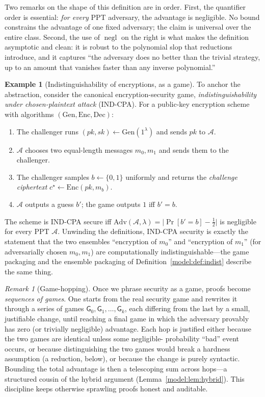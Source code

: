 \documentclass[11pt,a4paper]{article}
\theoremstyle{definition}
\newtheorem{example}[theorem]{Example}
\theoremstyle{remark}
\newtheorem{remark}[theorem]{Remark}
\DeclareMathOperator{\negl}{negl}
\begin{document}
Two remarks on the shape of this definition are in order. First, the quantifier
order is essential: \emph{for every} PPT adversary, the advantage is negligible.
No bound constrains the advantage of one fixed adversary; the claim is universal over
the entire class. Second, the use of \(\negl\) on the right is what makes the
definition asymptotic and clean: it is robust to the polynomial slop that
reductions introduce, and it captures ``the adversary does no better than the trivial
strategy, up to an amount that vanishes faster than any inverse polynomial.''

\begin{example}[Indistinguishability of encryptions, as a game]\label{model:exp:ind-cpa}
To anchor the abstraction, consider the canonical encryption-security game,
\emph{indistinguishability under chosen-plaintext attack} (IND-CPA). For a
public-key encryption scheme with algorithms
\((\mathrm{Gen},\mathrm{Enc},\mathrm{Dec})\):
\begin{enumerate}
\item The challenger runs \((pk,sk)\leftarrow \mathrm{Gen}(1^\lambda)\) and sends
  \(pk\) to \(\mathcal{A}\).
\item \(\mathcal{A}\) chooses two equal-length messages \(m_0, m_1\) and sends
  them to the challenger.
\item The challenger samples \(b \leftarrow \{0,1\}\) uniformly and returns the
  \emph{challenge ciphertext} \(c^\star \leftarrow \mathrm{Enc}(pk, m_b)\).
\item \(\mathcal{A}\) outputs a guess \(b'\); the game outputs \(1\) iff
  \(b'=b\).
\end{enumerate}
The scheme is IND-CPA secure iff
\(\mathrm{Adv}(\mathcal{A},\lambda)=\bigl|\Pr[b'=b]-\tfrac12\bigr|\) is negligible
for every PPT \(\mathcal{A}\). Unwinding the definitions, IND-CPA security is
exactly the statement that the two ensembles ``encryption of \(m_0\)'' and
``encryption of \(m_1\)'' (for adversarially chosen \(m_0,m_1\)) are
computationally indistinguishable---the game packaging and the
ensemble packaging of Definition~\ref{model:def:indist} describe the same thing.
\end{example}

\begin{remark}[Game-hopping]\label{model:rem:game-hopping}
Once we phrase security as a game, proofs become \emph{sequences of games}. One
starts from the real security game and rewrites it through a series of games
\(\mathsf{G}_0, \mathsf{G}_1, \dots, \mathsf{G}_k\), each differing from the last
by a small, justifiable change, until reaching a final game in which the
adversary provably has zero (or trivially negligible) advantage. Each hop is
justified either because the two games are identical unless some negligible-
probability ``bad'' event occurs, or because distinguishing the two games would
break a hardness assumption (a reduction, below), or because the change is purely
syntactic. Bounding the total advantage is then a telescoping sum across hops---a
structured cousin of the hybrid argument
(Lemma~\ref{model:lem:hybrid}). This discipline keeps otherwise sprawling proofs
honest and auditable.
\end{remark}
\end{document}
